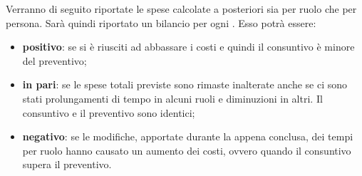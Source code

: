 	Verranno di seguito riportate le spese calcolate a posteriori sia per ruolo che per persona.
	Sarà quindi riportato un bilancio per ogni . Esso potrà essere:
	\begin{itemize}
		\item \textbf{positivo}: se si è riusciti ad abbassare i costi e quindi il consuntivo è minore del preventivo;
		\item \textbf{in pari}: se le spese totali previste sono rimaste inalterate anche se ci sono stati prolungamenti di tempo in alcuni ruoli e diminuzioni in altri. Il consuntivo e il preventivo sono identici;
		\item \textbf{negativo}: se le modifiche, apportate durante la  appena conclusa, dei tempi per ruolo hanno causato un aumento dei costi, ovvero quando il consuntivo supera il preventivo.
	\end{itemize}
	
						
						

